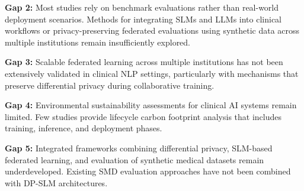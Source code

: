 \textbf{Gap 2:} Most studies rely on benchmark evaluations rather than real-world deployment scenarios. Methods for integrating SLMs and LLMs into clinical workflows or privacy-preserving federated evaluations using synthetic data across multiple institutions remain insufficiently explored.

\textbf{Gap 3:} Scalable federated learning across multiple institutions has not been extensively validated in clinical NLP settings, particularly with mechanisms that preserve differential privacy during collaborative training.

\textbf{Gap 4:} Environmental sustainability assessments for clinical AI systems remain limited. Few studies provide lifecycle carbon footprint analysis that includes training, inference, and deployment phases.

\textbf{Gap 5:} Integrated frameworks combining differential privacy, SLM-based federated learning, and evaluation of synthetic medical datasets remain underdeveloped. Existing SMD evaluation approaches have not been combined with DP-SLM architectures.

